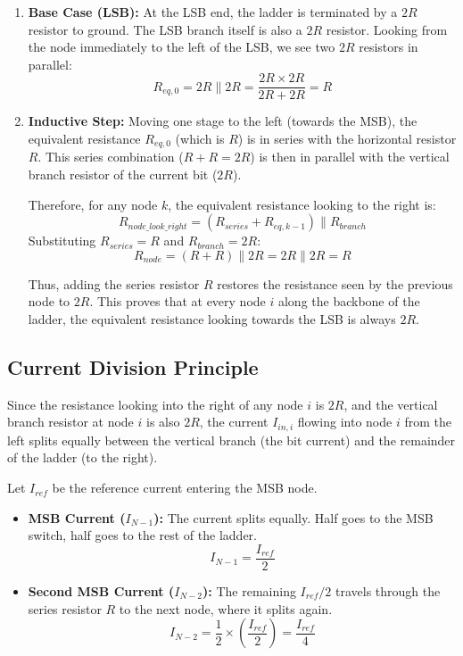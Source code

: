 \documentclass[11pt, a4paper]{article}
\begin{document}
\begin{enumerate}
    \item \textbf{Base Case (LSB):}
    At the LSB end, the ladder is terminated by a $2R$ resistor to ground. The LSB branch itself is also a $2R$ resistor. Looking from the node immediately to the left of the LSB, we see two $2R$ resistors in parallel:
    \begin{equation}
        R_{eq, 0} = 2R \parallel 2R = \frac{2R \times 2R}{2R + 2R} = R
    \end{equation}
    
    \item \textbf{Inductive Step:}
    Moving one stage to the left (towards the MSB), the equivalent resistance $R_{eq, 0}$ (which is $R$) is in series with the horizontal resistor $R$. This series combination ($R + R = 2R$) is then in parallel with the vertical branch resistor of the current bit ($2R$).
    
    Therefore, for any node $k$, the equivalent resistance looking to the right is:
    \begin{equation}
        R_{node\_look\_right} = (R_{series} + R_{eq, k-1}) \parallel R_{branch}
    \end{equation}
    Substituting $R_{series}=R$ and $R_{branch}=2R$:
    \begin{equation}
        R_{node} = (R + R) \parallel 2R = 2R \parallel 2R = R
    \end{equation}
    
    Thus, adding the series resistor $R$ restores the resistance seen by the previous node to $2R$. This proves that at every node $i$ along the backbone of the ladder, the equivalent resistance looking towards the LSB is always $2R$.
\end{enumerate}

\subsection{Current Division Principle}
Since the resistance looking into the right of any node $i$ is $2R$, and the vertical branch resistor at node $i$ is also $2R$, the current $I_{in, i}$ flowing into node $i$ from the left splits equally between the vertical branch (the bit current) and the remainder of the ladder (to the right).

Let $I_{ref}$ be the reference current entering the MSB node.
\begin{itemize}
    \item \textbf{MSB Current ($I_{N-1}$):} The current splits equally. Half goes to the MSB switch, half goes to the rest of the ladder.
    \begin{equation}
        I_{N-1} = \frac{I_{ref}}{2}
    \end{equation}
    \item \textbf{Second MSB Current ($I_{N-2}$):} The remaining $I_{ref}/2$ travels through the series resistor $R$ to the next node, where it splits again.
    \begin{equation}
        I_{N-2} = \frac{1}{2} \times \left( \frac{I_{ref}}{2} \right) = \frac{I_{ref}}{4}
    \end{equation}
\end{itemize}
\end{document}
